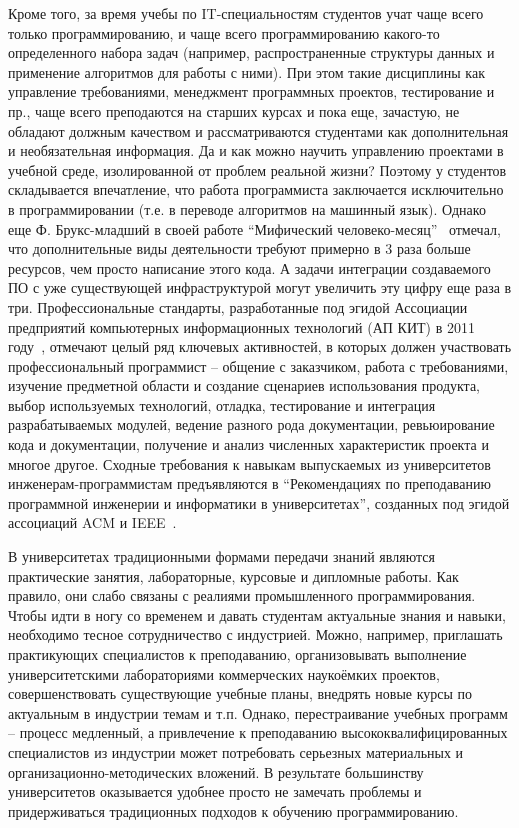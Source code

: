 \documentclass[a5paper]{article}
\begin{document}
Кроме того, за время учебы по IT-специальностям студентов учат чаще всего только программированию, и чаще всего программированию  какого-то определенного набора задач (например, распространенные структуры данных и применение алгоритмов для работы с ними). При этом такие дисциплины как управление требованиями, менеджмент программных проектов, тестирование и пр., чаще всего преподаются на старших курсах и пока еще, зачастую, не обладают должным качеством и рассматриваются студентами как дополнительная и необязательная информация. Да и как можно научить управлению проектами в учебной среде, изолированной от проблем реальной жизни? Поэтому у студентов складывается впечатление, что работа программиста заключается исключительно в программировании  (т.е. в переводе алгоритмов на машинный язык). Однако еще Ф. Брукс-младший в своей работе ``Мифический человеко-месяц''~\cite{brooks} отмечал, что дополнительные виды деятельности требуют примерно в 3 раза больше ресурсов, чем просто написание этого кода. А задачи интеграции создаваемого ПО с уже существующей инфраструктурой могут увеличить эту цифру еще раза в три. Профессиональные стандарты, разработанные под эгидой Ассоциации предприятий компьютерных информационных технологий (АП КИТ) в 2011 году~\cite{apkit},  отмечают целый ряд ключевых активностей, в которых должен участвовать профессиональный программист -- общение с заказчиком, работа с требованиями, изучение предметной области и создание сценариев использования продукта, выбор используемых технологий, отладка, тестирование и интеграция разрабатываемых модулей, ведение разного рода документации, ревьюирование кода и документации, получение и анализ численных характеристик проекта и многое другое. Сходные требования к навыкам  выпускаемых из университетов инженерам-программистам предъявляются в ``Рекомендациях по преподаванию программной инженерии и информатики в университетах'', созданных под эгидой ассоциаций ACM и  IEEE~\cite{curriculum}. 

В университетах традиционными формами передачи знаний  являются практические занятия, лабораторные, курсовые и дипломные работы. Как правило, они слабо связаны с реалиями промышленного программирования. Чтобы идти в ногу со временем и давать студентам актуальные знания и навыки, необходимо тесное сотрудничество с индустрией. Можно, например, приглашать практикующих специалистов к преподаванию, организовывать выполнение университетскими лабораториями коммерческих наукоёмких  проектов, совершенствовать существующие учебные планы, внедрять новые курсы по актуальным в индустрии темам и  т.п. Однако, перестраивание учебных программ -- процесс медленный, а привлечение к преподаванию высококвалифицированных специалистов из индустрии может потребовать серьезных материальных и организационно-методических вложений. В результате большинству университетов оказывается удобнее просто не замечать проблемы и придерживаться традиционных подходов к обучению программированию.
\end{document}

